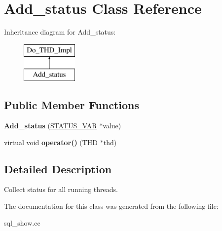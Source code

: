 \hypertarget{classAdd__status}{}\section{Add\+\_\+status Class Reference}
\label{classAdd__status}
Inheritance diagram for Add\+\_\+status\+:\begin{figure}[H]
\begin{center}
\leavevmode
\includegraphics[height=2.000000cm]{classAdd__status}
\end{center}
\end{figure}
\subsection*{Public Member Functions}
\begin{DoxyCompactItemize}
\item 
\mbox{\label{classAdd__status_a23f17c31a66a24b020ce327bfff5ca6b}} 
{\bfseries Add\+\_\+status} (\mbox{\hyperlink{structsystem__status__var}{S\+T\+A\+T\+U\+S\+\_\+\+V\+AR}} $\ast$value)
\item 
\mbox{\label{classAdd__status_aff2532dcc3d603ac90faad32f286ff04}} 
virtual void {\bfseries operator()} (T\+HD $\ast$thd)
\end{DoxyCompactItemize}


\subsection{Detailed Description}
Collect status for all running threads. 

The documentation for this class was generated from the following file\+:\begin{DoxyCompactItemize}
\item 
sql\+\_\+show.\+cc\end{DoxyCompactItemize}

